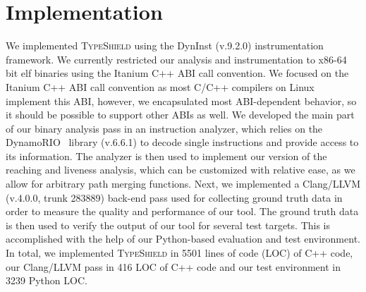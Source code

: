 \section{Implementation}
\label{chapter:Implementation}

We implemented \textsc{TypeShield} using the DynInst (v.9.2.0) instrumentation framework. We currently restricted our analysis and instrumentation to x86-64 
bit elf binaries using the Itanium C++ ABI call convention.
We focused on the Itanium C++ ABI call 
convention as most C/C++ compilers on Linux implement this ABI, however, we encapsulated most ABI-dependent behavior, so it should be 
possible to support other ABIs as well. 
We developed the main part of our binary analysis pass in an instruction analyzer, which relies on the DynamoRIO~\cite{dynamorio:drmemory} library (v.6.6.1)
to decode single instructions and provide access to
its information. 
The analyzer is then used to implement our version of the reaching and liveness analysis, 
which can be customized with relative ease, as we allow for arbitrary path merging functions. 
Next, we implemented a 
Clang/LLVM (v.4.0.0, trunk 283889) back-end pass used for collecting ground truth data in order to measure the quality and performance of our tool. 
The ground truth data is then used to verify 
the output of our tool for several test targets. This is accomplished with the help of our Python-based evaluation and test environment. 
In total, we implemented \textsc{TypeShield} in 5501 lines of code (LOC) of C++ code, our Clang/LLVM pass in 416 LOC
of C++ code and our test environment in 3239 Python LOC. 


